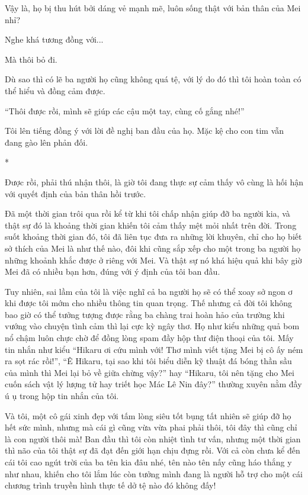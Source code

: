 {Vậy là, họ bị thu hút bởi dáng vẻ mạnh mẽ, luôn sống thật với bản thân
của Mei nhỉ?

Nghe khá tương đồng với...

Mà thôi bỏ đi.

Dù sao thì có lẽ ba người họ cũng không quá tệ, với lý do đó thì tôi
hoàn toàn có thể hiểu và đồng cảm được.

``Thôi được rồi, mình sẽ giúp các cậu một tay, cùng cố gắng nhé!''

Tôi lên tiếng đồng ý với lời đề nghị ban đầu của họ. Mặc kệ cho con tim
vẫn đang gào lên phản đối.

*

Được rồi, phải thú nhận thôi, là giờ tôi đang thực sự cảm thấy vô cùng
là hối hận với quyết định của bản thân hồi trước.

Đã một thời gian trôi qua rồi kể từ khi tôi chấp nhận giúp đỡ ba người
kia, và thật sự đó là khoảng thời gian khiến tôi cảm thấy mệt mỏi nhất
trên đời. Trong suốt khoảng thời gian đó, tôi đã liên tục đưa ra những
lời khuyên, chỉ cho họ biết sở thích của Mei là như thế nào, đôi khi
cũng sắp xếp cho một trong ba người họ những khoảnh khắc được ở riêng
với Mei. Và thật sự nó khá hiệu quả khi bây giờ Mei đã có nhiều bạn hơn,
đúng với ý định của tôi ban đầu.

Tuy nhiên, sai lầm của tôi là việc nghĩ cả ba người họ sẽ có thể xoay sở
ngon ơ khi được tôi mớm cho nhiều thông tin quan trọng. Thế nhưng cả đời
tôi không bao giờ có thể tưởng tượng được rằng ba chàng trai hoàn hảo
của trường khi vướng vào chuyện tình cảm thì lại cực kỳ ngây thơ. Họ như
kiểu những quả bom nổ chậm luôn chực chờ để đồng lòng spam đầy hộp thư
điện thoại của tôi. Mấy tin nhắn như kiểu ``Hikaru ơi cứu mình với! Thơ
mình viết tặng Mei bị cô ấy ném ra sọt rác rồi!'', ``Ê Hikaru, tại sao
khi tôi biểu diễn kỹ thuật đá bóng thần sầu của mình thì Mei lại bỏ về
giữa chừng vậy?'' hay ``Hikaru, tôi nên tặng cho Mei cuốn sách vật lý
lượng tử hay triết học Mác Lê Nin đây?'' thường xuyên nằm đầy ú ụ trong
hộp tin nhắn của tôi.

Và tôi, một cô gái xinh đẹp với tấm lòng siêu tốt bụng tất nhiên sẽ giúp
đỡ họ hết sức mình, nhưng mà cái gì cũng vừa vừa phai phải thôi, tôi đây
thì cũng chỉ là con người thôi mà! Ban đầu thì tôi còn nhiệt tình tư
vấn, nhưng một thời gian thì não của tôi thật sự đã đạt đến giới hạn
chịu đựng rồi. Với cả còn chưa kể đến cái tôi cao ngút trời của ba tên
kia đâu nhé, tên nào tên nấy cũng háo thắng y như nhau, khiến cho tôi
lắm lúc còn tưởng mình đang là người hỗ trợ cho một cái chương trình
truyền hình thực tế dở tệ nào đó không đấy!

}

